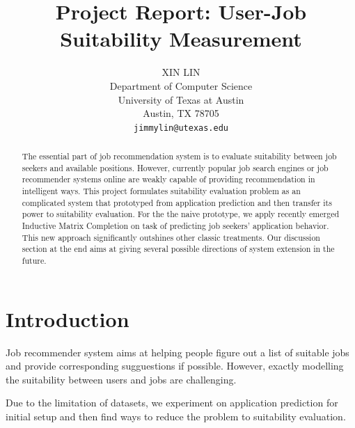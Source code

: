 \documentclass{article} %
\title{Project Report: User-Job Suitability Measurement}
\author{
XIN LIN \\
Department of Computer Science\\
University of Texas at Austin \\
Austin, TX 78705 \\
\texttt{jimmylin@utexas.edu} \\
}
\begin{document}
\maketitle

\begin{abstract}

The essential part of job recommendation system is to evaluate suitability
between job seekers and available positions. However, currently popular job search
engines or job recommender systems online are weakly capable of providing
recommendation in intelligent ways. 
This project formulates suitability
evaluation problem as an complicated system that prototyped from application
prediction and then transfer its power to suitability evaluation. 
For the the naive prototype, we apply recently emerged Inductive Matrix
Completion on task of predicting job seekers' application behavior. This new
approach significantly outshines other classic treatments. 
Our discussion section at the end aims at giving several possible directions
of system extension in the future.
 


\end{abstract}




\section{Introduction}
Job recommender system aims at helping people figure out a list of suitable
jobs and provide corresponding sugguestions if possible. However, exactly
modelling the suitability between users and jobs are challenging.

Due to the limitation of datasets, we experiment on application prediction for
initial setup and then find ways to reduce the problem to suitability
evaluation. 
\end{document}
